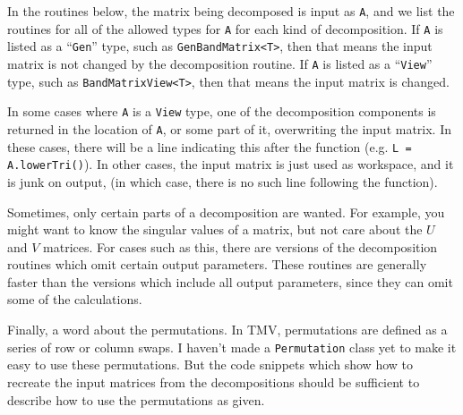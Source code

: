 \documentclass[twoside,letterpaper,11pt]{article}
\renewcommand{\tt}[1]{{\lstinline {#1}}}
\begin{document}
In the routines below, the matrix being decomposed is input as \tt{A}, and we
list the routines for all of the 
allowed types for \tt{A} for each kind of decomposition.  If \tt{A} is listed as a ``\tt{Gen}''
type, such as \tt{GenBandMatrix<T>}, then that means the input matrix is not 
changed by the decomposition routine.  
If \tt{A} is listed as a ``\tt{View}'' type,
such as \tt{BandMatrixView<T>}, then that means the input matrix is 
changed.  

In some cases where \tt{A} is a \tt{View} type, one of the decomposition components is 
returned in the location of 
\tt{A}, or some part of it, overwriting the input matrix.  
In these cases, there will be a line indicating this
after the function (e.g. \tt{L = A.lowerTri()}).
In other cases, the input matrix is just used as workspace, and it is junk
on output, (in which case, there is no such line following the function).

Sometimes, only certain parts of a decomposition are wanted.  For example,
you might want to know the singular values of a matrix, but not care about
the $U$ and $V$ matrices.  For cases such as this, there are versions
of the decomposition routines which omit certain output parameters.
These routines are generally faster than the versions which include all
output parameters, since they can omit some of the calculations.

Finally, a word about the permutations.  In TMV, permutations are
defined as a series of row or column swaps.  I haven't made a \tt{Permutation}
class yet to make it easy to use these permutations.  But the 
code snippets which show how to recreate the input matrices from
the decompositions should be sufficient to describe how to use the 
permutations as given.
\end{document}
